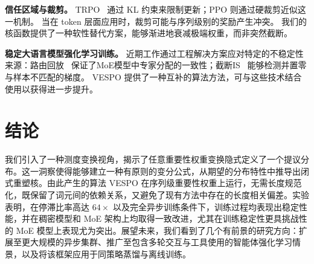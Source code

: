 \documentclass{article}
\theoremstyle{plain}
\theoremstyle{definition}
\theoremstyle{remark}
\begin{document}
\textbf{信任区域与裁剪。}
TRPO~\citep{Schulman2015TRPO} 通过 KL 约束来限制更新；PPO 则通过硬裁剪近似这一机制。  
当在 token 层面应用时，裁剪可能与序列级别的奖励产生冲突。  
我们的核函数提供了一种软性替代方案，能够渐进地衰减极端权重，而非突然截断。

\textbf{稳定大语言模型强化学习训练。}
近期工作通过工程解决方案应对特定的不稳定性来源：路由回放~\citep{ma2025stabilizingmoereinforcementlearning} 保证了MoE模型中专家分配的一致性；截断IS~\citep{liu-li-2025-rl-collapse} 能够检测并置零与样本不匹配的梯度。
VESPO 提供了一种互补的算法方法，可与这些技术结合使用以获得进一步提升。


\section{结论}
\label{sec:conclusion}

我们引入了一种测度变换视角，揭示了任意重要性权重变换隐式定义了一个提议分布。这一洞察使得能够建立一种有原则的变分公式，从期望的分布特性中推导出闭式重塑核。由此产生的算法 VESPO 在序列级重要性权重上运行，无需长度规范化，既保留了词元间的依赖关系，又避免了现有方法中存在的长度相关偏差。实验表明，在停滞比率高达 $64\times$ 以及完全异步训练条件下，训练过程均表现出稳定性能，并在稠密模型和 MoE 架构上均取得一致改进，尤其在训练稳定性更具挑战性的 MoE 模型上表现尤为突出。展望未来，我们看到了几个有前景的研究方向：扩展至更大规模的异步集群、推广至包含多轮交互与工具使用的智能体强化学习情景，以及将该框架应用于同策略蒸馏与离线训练。
\end{document}
